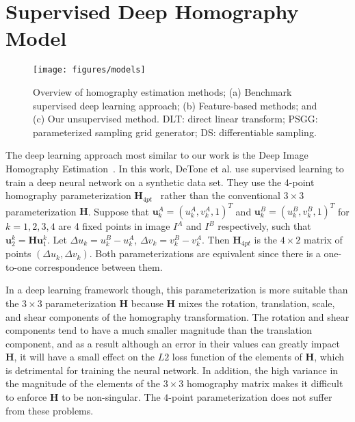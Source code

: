 \documentclass[letterpaper, 10 pt, conference]{ieeeconf}
\begin{document}
 




 \section{Supervised Deep Homography Model}
\begin{figure*}[t]
\centering
\vspace{2mm}
\texttt{[image: figures/models]}
\caption{Overview of homography estimation methods; (a) Benchmark supervised deep learning approach; (b) Feature-based methods; and (c) Our unsupervised method. DLT: direct linear transform; 
PSGG: parameterized sampling grid generator; DS: differentiable sampling. 
\label{fig:methods}
}
\vspace{-2mm}
\end{figure*}

The deep learning approach most similar to our work is the Deep Image Homography Estimation~\cite{detone2016}. In this work, DeTone et al. use supervised learning to train a deep neural network on a synthetic data set. They use the 4-point homography parameterization $\mathbf{H}_{4pt}$~\cite{baker2006parameterizing} rather than the conventional $3 \times 3$ parameterization $\mathbf{H}$. Suppose that $\mathbf{u}^A_k = (u^A_k, v_k^A,1)^T$ and $\mathbf{u}_k^B = (u_k^B, v_k^B,1)^T$ for $k = 1, 2, 3, 4$ are 4 fixed points in image $I^A$  and $I^B$ respectively, such that $\mathbf{u}_2^k = \mathbf{H} \mathbf{u}_1^k.$ Let $\Delta u_k = u_k^B -   u_k^A$, $\Delta v_k = v_k^B -   v_k^A$. Then $\mathbf{H}_{4pt}$ is the $4\times 2$ matrix of points $(\Delta u_k, \Delta v_k)$. Both parameterizations are equivalent since there is a one-to-one correspondence between them. 

In a deep learning framework though, this parameterization is more suitable than the $3 \times 3$ parameterization $\mathbf{H}$ because $\mathbf{H}$ mixes the rotation, translation, scale, and shear components of the homography transformation. The rotation and shear components tend to have a much smaller magnitude than the translation component, and as a result although an error in their values can greatly impact $\mathbf{H}$, it will have a small effect on the $L2$ loss function of the elements of $\mathbf{H}$, which is detrimental for training the neural network. In addition, the high variance in the magnitude of the elements of the $3 \times 3$ homography matrix makes it difficult to enforce $\mathbf{H}$ to be non-singular. The $4$-point parameterization does not suffer from these problems.
\end{document}
